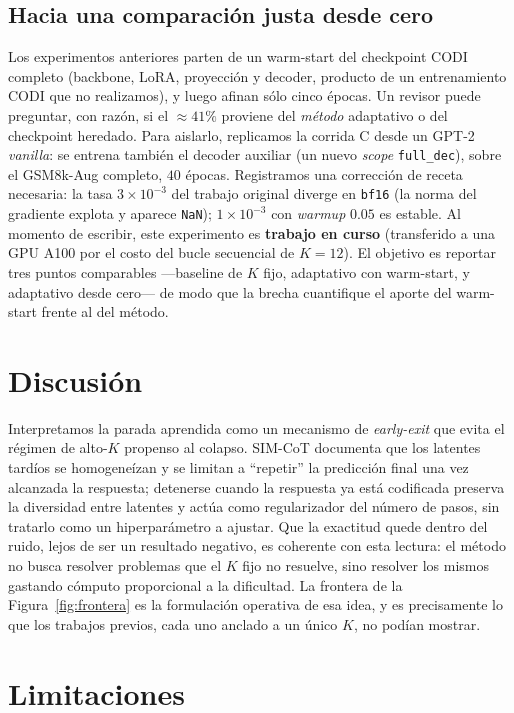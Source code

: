 \documentclass[11pt]{article}
\begin{document}
\subsection{Hacia una comparación justa desde cero}
\label{sec:fromscratch}

Los experimentos anteriores parten de un warm-start del checkpoint CODI completo (backbone, LoRA, proyección y decoder, producto de un entrenamiento CODI que no realizamos), y luego afinan sólo cinco épocas. Un revisor puede preguntar, con razón, si el $\approx 41\%$ proviene del \emph{método} adaptativo o del checkpoint heredado. Para aislarlo, replicamos la corrida C desde un GPT-2 \emph{vanilla}: se entrena también el decoder auxiliar (un nuevo \textit{scope} \texttt{full\_dec}), sobre el GSM8k-Aug completo, $40$ épocas. Registramos una corrección de receta necesaria: la tasa $3\times10^{-3}$ del trabajo original diverge en \texttt{bf16} (la norma del gradiente explota y aparece \texttt{NaN}); $1\times10^{-3}$ con \textit{warmup} $0.05$ es estable. Al momento de escribir, este experimento es \textbf{trabajo en curso} (transferido a una GPU A100 por el costo del bucle secuencial de $K=12$). El objetivo es reportar tres puntos comparables ---baseline de $K$ fijo, adaptativo con warm-start, y adaptativo desde cero--- de modo que la brecha cuantifique el aporte del warm-start frente al del método.

\section{Discusión}

Interpretamos la parada aprendida como un mecanismo de \emph{early-exit} que evita el régimen de alto-$K$ propenso al colapso. SIM-CoT \citep{wei2025simcot} documenta que los latentes tardíos se homogeneízan y se limitan a ``repetir'' la predicción final una vez alcanzada la respuesta; detenerse cuando la respuesta ya está codificada preserva la diversidad entre latentes y actúa como regularizador del número de pasos, sin tratarlo como un hiperparámetro a ajustar. Que la exactitud quede dentro del ruido, lejos de ser un resultado negativo, es coherente con esta lectura: el método no busca resolver problemas que el $K$ fijo no resuelve, sino resolver los mismos gastando cómputo proporcional a la dificultad. La frontera de la Figura~\ref{fig:frontera} es la formulación operativa de esa idea, y es precisamente lo que los trabajos previos, cada uno anclado a un único $K$, no podían mostrar.

\section*{Limitaciones}
\end{document}
